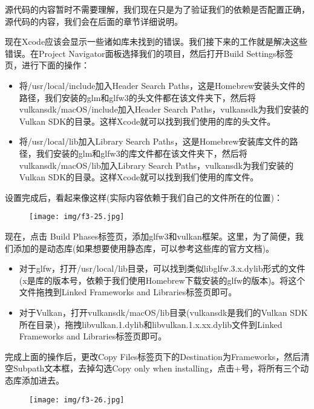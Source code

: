 \documentclass{ctexart}
\begin{document}
源代码的内容暂时不需要理解，我们现在只是为了验证我们的依赖是否配置正确，源代码的内容，我们会在后面的章节详细说明。

现在Xcode应该会显示一些诸如库未找到的错误。我们接下来的工作就是解决这些错误。在Project Navigator面板选择我们的项目，然后打开Build Settings标签页，进行下面的操作：

\begin{itemize}
	\item 将/usr/local/include加入Header Search Paths，这是Homebrew安装头文件的路径，我们安装的glm和glfw3的头文件都在该文件夹下，然后将vulkansdk/macOS/include加入Header Search Paths，vulkansdk为我们安装的Vulkan SDK的目录。这样Xcode就可以找到我们使用的库的头文件。
	\item 将/usr/local/lib加入Library Search Paths，这是Homebrew安装库文件的路径，我们安装的glm和glfw3的库文件都在该文件夹下，然后将vulkansdk/macOS/lib加入Library Search Paths，vulkansdk为我们安装的Vulkan SDK的目录。这样Xcode就可以找到我们使用的库文件。
\end{itemize}

设置完成后，看起来像这样(实际内容依赖于我们自己的文件所在的位置)：

\begin{figure}[H]
	\centering
	\texttt{[image: img/f3-25.jpg]}
\end{figure}

现在，点击 Build Phases标签页，添加glfw3和vulkan框架。这里，为了简便，我们添加的是动态库(如果想要使用静态库，可以参考这些库的官方文档)。

\begin{itemize}
	\item 对于glfw，打开/usr/local/lib目录，可以找到类似libglfw.3.x.dylib形式的文件(x是库的版本号，依赖于我们使用Homebrew下载安装的glfw的版本)。将这个文件拖拽到Linked Frameworks and Libraries标签页即可。
	\item 对于Vulkan，打开vulkansdk/macOS/lib目录(vulkansdk是我们的Vulkan SDK所在目录)，拖拽libvulkan.1.dylib和libvulkan.1.x.xx.dylib文件到Linked Frameworks and Libraries标签页即可。
\end{itemize}

完成上面的操作后，更改Copy Files标签页下的Destination为Frameworks，然后清空Subpath文本框，去掉勾选Copy only when installing，点击+号，将所有三个动态库添加进去。

\begin{figure}[H]
	\centering
	\texttt{[image: img/f3-26.jpg]}
\end{figure}
\end{document}
